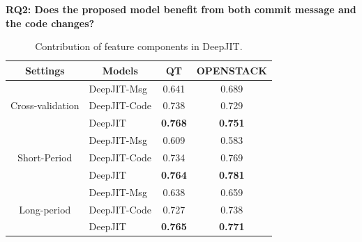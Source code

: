 \noindent \textbf{RQ2: Does the proposed model benefit from both commit message and the code changes?}

\begin{table}[ht!]
  \centering
  \caption{Contribution of feature components in DeepJIT.}
    \begin{tabular}{|c|l|c|c|}
    \hline
    \textbf{Settings} & \multicolumn{1}{c|}{\textbf{Models}} & QT & OPENSTACK \\
    \hline
    \hline
    \multirow{3}[6]{*}{Cross-validation} & DeepJIT-Msg & 0.641 & 0.689 \\
\cline{2-4}          & DeepJIT-Code & 0.738 & 0.729 \\
\cline{2-4}          & DeepJIT & \textbf{0.768} & \textbf{0.751} \\
    \hline
    \multirow{3}[6]{*}{Short-Period} & DeepJIT-Msg & 0.609 & 0.583 \\
\cline{2-4}          & DeepJIT-Code & 0.734 & 0.769 \\
\cline{2-4}          & DeepJIT & \textbf{0.764} & \textbf{0.781} \\
    \hline
    \multirow{3}[6]{*}{Long-period} & DeepJIT-Msg & 0.638 & 0.659 \\
\cline{2-4}          & DeepJIT-Code & 0.727 & 0.738 \\
\cline{2-4}          & DeepJIT & \textbf{0.765} & \textbf{0.771} \\
    \hline
    \end{tabular}%
  \label{tab:variants}%
\end{table}%


